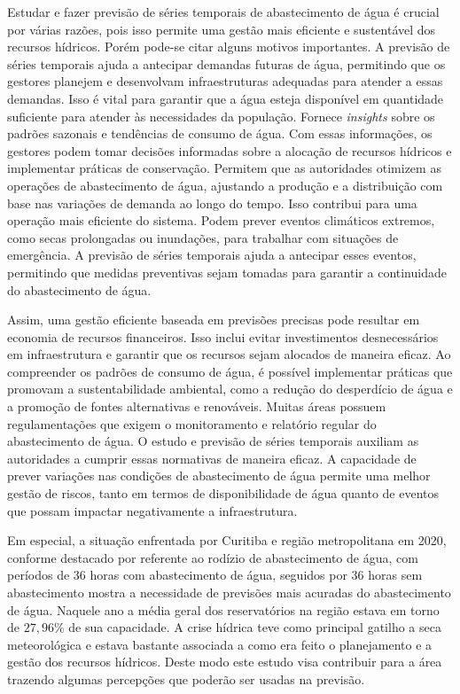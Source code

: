 Estudar e fazer previsão de séries temporais de abastecimento de água é crucial por várias razões, pois isso permite uma gestão mais eficiente e sustentável dos recursos hídricos. Porém pode-se citar alguns motivos importantes. A previsão de séries temporais ajuda a antecipar demandas futuras de água, permitindo que os gestores planejem e desenvolvam infraestruturas adequadas para atender a essas demandas. Isso é vital para garantir que a água esteja disponível em quantidade suficiente para atender às necessidades da população. Fornece \textit{insights} sobre os padrões sazonais e tendências de consumo de água. Com essas informações, os gestores podem tomar decisões informadas sobre a alocação de recursos hídricos e implementar práticas de conservação. Permitem que as autoridades otimizem as operações de abastecimento de água, ajustando a produção e a distribuição com base nas variações de demanda ao longo do tempo. Isso contribui para uma operação mais eficiente do sistema. Podem prever eventos climáticos extremos, como secas prolongadas ou inundações, para trabalhar com situações de emergência. A previsão de séries temporais ajuda a antecipar esses eventos, permitindo que medidas preventivas sejam tomadas para garantir a continuidade do abastecimento de água.

Assim, uma gestão eficiente baseada em previsões precisas pode resultar em economia de recursos financeiros. Isso inclui evitar investimentos desnecessários em infraestrutura e garantir que os recursos sejam alocados de maneira eficaz. Ao compreender os padrões de consumo de água, é possível implementar práticas que promovam a sustentabilidade ambiental, como a redução do desperdício de água e a promoção de fontes alternativas e renováveis. Muitas áreas possuem regulamentações que exigem o monitoramento e relatório regular do abastecimento de água. O estudo e previsão de séries temporais auxiliam as autoridades a cumprir essas normativas de maneira eficaz. A capacidade de prever variações nas condições de abastecimento de água permite uma melhor gestão de riscos, tanto em termos de disponibilidade de água quanto de eventos que possam impactar negativamente a infraestrutura.

Em especial, a situação enfrentada por Curitiba e região metropolitana em 2020, conforme destacado por \cite{vasconcelos_2020} referente ao rodízio de abastecimento de água, com períodos de 36 horas com abastecimento de água, seguidos por 36 horas sem abastecimento mostra a necessidade de previsões mais acuradas do abastecimento de água. Naquele ano a média geral dos reservatórios na região estava em torno de $27,96\%$ de sua capacidade. A crise hídrica teve como principal gatilho a seca meteorológica e estava bastante associada a como era feito o planejamento e a gestão dos recursos hídricos. Deste modo este estudo visa contribuir para a área trazendo algumas percepções que poderão ser usadas na previsão.

